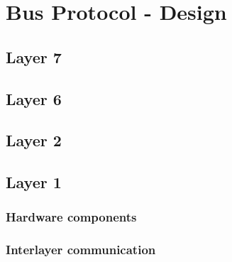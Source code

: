 \section{Bus Protocol - Design}
\label{sec:bus:design}

\subsection{Layer 7}

\subsection{Layer 6}

\subsection{Layer 2}

\subsection{Layer 1}
\subsubsection{Hardware components}
\subsubsection{Interlayer communication}

